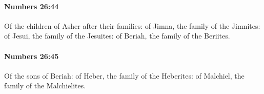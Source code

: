 		\paragraph{Numbers 26:44} %
			\label{NUMBERS-26-44}

			Of the children of Asher after their families: of Jimna, the family of the Jimnites: of Jesui, the family of the Jesuites: of Beriah, the family of the Beriites.


		\paragraph{Numbers 26:45} %
			\label{NUMBERS-26-45}

			Of the sons of Beriah: of Heber, the family of the Heberites: of Malchiel, the family of the Malchielites.


